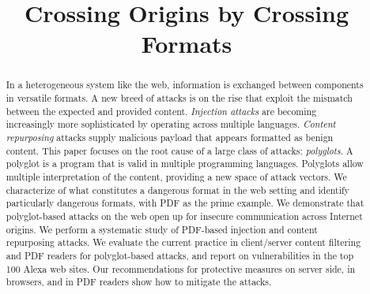 \documentclass[10pt, conference, compsocconf]{IEEEtran}
\title{Crossing Origins by Crossing Formats}
\begin{document}

\maketitle



\begin{abstract}
  In a heterogeneous system like the web, information is exchanged
  between components in versatile formats. A new breed of attacks is
  on the rise that exploit the mismatch between the expected and
  provided content. \emph{Injection attacks} are becoming increasingly
  more sophisticated by operating across multiple
  languages. \emph{Content repurposing} attacks supply malicious
  payload that appears formatted as benign content.
%
  This paper focuses on the root cause of a large class of attacks:
  \emph{polyglots}. A polyglot is a program that is valid in multiple
  programming languages. Polyglots allow multiple interpretation of
  the content, providing a new space of attack vectors. We
  characterize of what constitutes a dangerous format in the web
  setting and identify particularly dangerous formats, with PDF as the
  prime example. We demonstrate that polyglot-based attacks on the web
  open up for insecure communication across Internet origins. We
  perform a systematic study of PDF-based injection and content
  repurposing attacks. We evaluate the current practice in
  client/server content filtering and PDF readers for polyglot-based
  attacks, and report on vulnerabilities in the top 100 Alexa web sites.
  Our recommendations for protective measures on server side, in 
  browsers, and in PDF readers show how to mitigate the attacks.
\end{abstract}
\end{document}
